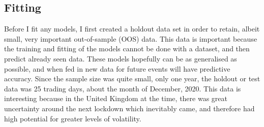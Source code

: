 \subsection{Fitting}
Before I fit any models, I first created a holdout data set in order to retain, albeit small, very important out-of-sample (OOS) data. This data is important because the training and fitting of the models cannot be done with a dataset, and then predict already seen data. These models hopefully can be as generalised as possible, and when fed in new data for future events will have predictive accuracy. Since the sample size was quite small, only one year, the holdout or test data was 25 trading days, about the month of December, 2020. This data is interesting because in the United Kingdom at the time, there was great uncertainty around the next lockdown which inevitably came, and therefore had high potential for greater levels of volatility. 

